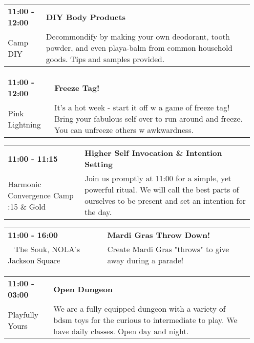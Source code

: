 \begin{tabular}{ p{1in} p{2.2in} }
    \textbf{11:00 - 12:00} & \textbf{DIY Body Products} \\
    Camp DIY \newline  & Decommondify by making your own deodorant, tooth powder, and even playa-balm from common household goods. Tips and samples provided. \\
    \hline 
\end{tabular}
    
\begin{tabular}{ p{1in} p{2.2in} }
    \textbf{11:00 - 12:00} & \textbf{Freeze Tag!} \\
    Pink Lightning \newline  & It's a hot week - start it off w a game of freeze tag! Bring your fabulous self over to run around and freeze. You can unfreeze others w awkwardness. \\
    \hline 
\end{tabular}
    
\begin{tabular}{ p{1in} p{2.2in} }
    \textbf{11:00 - 11:15} & \textbf{Higher Self Invocation \& Intention Setting} \\
    Harmonic Convergence Camp \newline 4:15 \& Gold & Join us promptly at 11:00 for a simple, yet powerful ritual.  We will call the best parts of ourselves to be present and set an intention for the day. \\
    \hline 
\end{tabular}
    
\begin{tabular}{ p{1in} p{2.2in} }
    \textbf{11:00 - 16:00} & \textbf{Mardi Gras Throw Down!} \\
    ~ \newline The Souk, NOLA's Jackson Square  & Create Mardi Gras "throws" to give away during a parade! \\
    \hline 
\end{tabular}
    
\begin{tabular}{ p{1in} p{2.2in} }
    \textbf{11:00 - 03:00} & \textbf{Open Dungeon} \\
    Playfully Yours \newline  & We are a fully equipped dungeon with a variety of bdsm toys for the curious to intermediate to play. We have daily classes. Open day and night. \\
    \hline 
\end{tabular}
    
